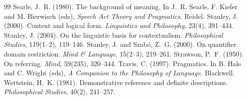 \documentclass{situationist-preprint}
\begin{document}
\begin{thebibliography}{99}
 Searle, J.~R. (1980). The background of meaning. In J.~R. Searle, F. Kiefer and M. Bierwisch (eds), \emph{Speech Act Theory and Pragmatics}. Reidel.
 Stanley, J. (2000). Context and logical form. \emph{Linguistics and Philosophy}, 23(4), 391--434.
 Stanley, J. (2004). On the linguistic basis for contextualism. \emph{Philosophical Studies}, 119(1--2), 119--146.
 Stanley, J. and Szab\'o, Z.~G. (2000). On quantifier domain restriction. \emph{Mind \& Language}, 15(2--3), 219--261.
 Strawson, P.~F. (1950). On referring. \emph{Mind}, 59(235), 320--344.
 Travis, C. (1997). Pragmatics. In B. Hale and C. Wright (eds), \emph{A Companion to the Philosophy of Language}. Blackwell.
 Wettstein, H.~K. (1981). Demonstrative reference and definite descriptions. \emph{Philosophical Studies}, 40(2), 241--257.
\end{thebibliography}
\end{document}
